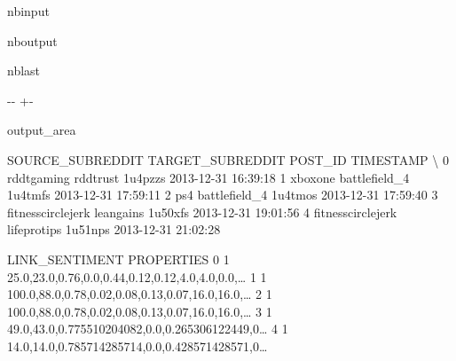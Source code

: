 \documentclass[letterpaper,10pt,english]{sphinxhowto}
\begin{document}
\begin{sphinxuseclass}{nbinput}
{
\begin{sphinxVerbatim}[commandchars=\\\{\}]
\llap{\color{nbsphinxin}[4]:\,\hspace{\fboxrule}\hspace{\fboxsep}}
\end{sphinxVerbatim}
}

\end{sphinxuseclass}
\begin{sphinxuseclass}{nboutput}
\begin{sphinxuseclass}{nblast}
{

\kern-\sphinxverbatimsmallskipamount\kern-\baselineskip
\kern+\FrameHeightAdjust\kern-\fboxrule
\vspace{\nbsphinxcodecellspacing}

\begin{sphinxuseclass}{output_area}
\begin{sphinxuseclass}{}


\begin{sphinxVerbatim}[commandchars=\\\{\}]
\llap{\color{nbsphinxout}[4]:\,\hspace{\fboxrule}\hspace{\fboxsep}}    SOURCE\_SUBREDDIT TARGET\_SUBREDDIT  POST\_ID            TIMESTAMP  \textbackslash{}
0         rddtgaming         rddtrust  1u4pzzs  2013-12-31 16:39:18
1            xboxone    battlefield\_4  1u4tmfs  2013-12-31 17:59:11
2                ps4    battlefield\_4  1u4tmos  2013-12-31 17:59:40
3  fitnesscirclejerk        leangains  1u50xfs  2013-12-31 19:01:56
4  fitnesscirclejerk      lifeprotips  1u51nps  2013-12-31 21:02:28

   LINK\_SENTIMENT                                         PROPERTIES
0               1  25.0,23.0,0.76,0.0,0.44,0.12,0.12,4.0,4.0,0.0,{\ldots}
1               1  100.0,88.0,0.78,0.02,0.08,0.13,0.07,16.0,16.0,{\ldots}
2               1  100.0,88.0,0.78,0.02,0.08,0.13,0.07,16.0,16.0,{\ldots}
3               1  49.0,43.0,0.775510204082,0.0,0.265306122449,0{\ldots}
4               1  14.0,14.0,0.785714285714,0.0,0.428571428571,0{\ldots}
\end{sphinxVerbatim}



\end{sphinxuseclass}
\end{sphinxuseclass}
}

\end{sphinxuseclass}
\end{sphinxuseclass}
\end{document}
